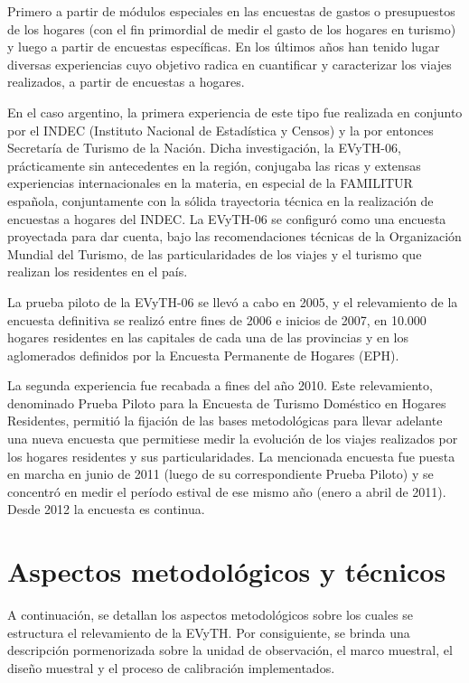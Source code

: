 \documentclass[
  openany]{book}
\begin{document}
Primero a partir de módulos especiales en las encuestas de gastos o presupuestos de los hogares (con el fin primordial de medir el gasto de los hogares en turismo) y luego a partir de encuestas específicas. En los últimos años han tenido lugar diversas experiencias cuyo objetivo radica en cuantificar y caracterizar los viajes realizados, a partir de encuestas a hogares.

En el caso argentino, la primera experiencia de este tipo fue realizada en conjunto por el INDEC (Instituto Nacional de Estadística y Censos) y la por entonces Secretaría de Turismo de la Nación. Dicha investigación, la EVyTH-06, prácticamente sin antecedentes en la región, conjugaba las ricas y extensas experiencias internacionales en la materia, en especial de la FAMILITUR española, conjuntamente con la sólida trayectoria técnica en la realización de encuestas a hogares del INDEC. La EVyTH-06 se configuró como una encuesta proyectada para dar cuenta, bajo las recomendaciones técnicas de la Organización Mundial del Turismo, de las particularidades de los viajes y el turismo que realizan los residentes en el país.

La prueba piloto de la EVyTH-06 se llevó a cabo en 2005, y el relevamiento de la encuesta definitiva se realizó entre fines de 2006 e inicios de 2007, en 10.000 hogares residentes en las capitales de cada una de las provincias y en los aglomerados definidos por la Encuesta Permanente de Hogares (EPH).

La segunda experiencia fue recabada a fines del año 2010. Este relevamiento, denominado Prueba Piloto para la Encuesta de Turismo Doméstico en Hogares Residentes, permitió la fijación de las bases metodológicas para llevar adelante una nueva encuesta que permitiese medir la evolución de los viajes realizados por los hogares residentes y sus particularidades. La mencionada encuesta fue puesta en marcha en junio de 2011 (luego de su correspondiente Prueba Piloto) y se concentró en medir el período estival de ese mismo año (enero a abril de 2011). Desde 2012 la encuesta es continua.

\hypertarget{aspectos-metodoluxf3gicos-y-tuxe9cnicos}{%
\chapter{\texorpdfstring{\textbf{Aspectos metodológicos y técnicos}}{Aspectos metodológicos y técnicos}}\label{aspectos-metodoluxf3gicos-y-tuxe9cnicos}}

A continuación, se detallan los aspectos metodológicos sobre los cuales se estructura el relevamiento de la EVyTH. Por consiguiente, se brinda una descripción pormenorizada sobre la unidad de observación, el marco muestral, el diseño muestral y el proceso de calibración implementados.
\end{document}
